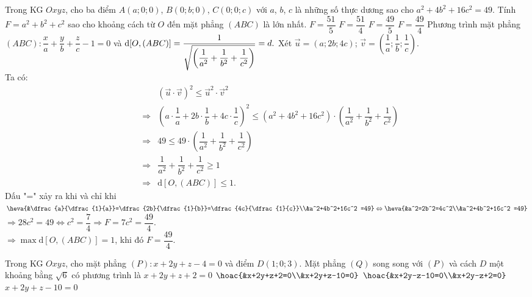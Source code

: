\begin{ex}%
	Trong KG $Oxyz$, cho ba điểm $A(a;0;0)$, $B(0;b;0)$, $C(0;0;c)$ với $a$, $b$, $c$ là những số thực dương sao cho $a^2+4b^2+16c^2=49$. Tính $F=a^2+b^2+c^2$ sao cho khoảng cách từ $O$ đến mặt phẳng $(ABC)$ là lớn nhất.
	\choice
	{$F=\dfrac{51}{5}$}
	{$F=\dfrac{51}{4}$}
	{$F=\dfrac{49}{5}$}
	{\True $F=\dfrac{49}{4}$}
	\loigiai
	{
		Phương trình mặt phẳng $(ABC): \dfrac{x}{a}+\dfrac{y}{b}+\dfrac{z}{c}-1=0$ và $\mathrm{d}[O,(ABC)]=\dfrac{1}{\sqrt{\left(\dfrac{1}{a^2}+\dfrac{1}{b^2}+\dfrac{1}{c^2}\right)}}=d.\\$	 
		Xét $\overrightarrow{u}=(a;2b;4c)$; $\overrightarrow{v}=\left(\dfrac{1}{a};\dfrac{1}{b};\dfrac{1}{c}\right)$.\\
		Ta có:
		\begin{eqnarray*}
			& & \left(\overrightarrow{u} \cdot \overrightarrow{v}\right)^2 \le \overrightarrow{u}^2 \cdot \overrightarrow{v}^2\\
			& \Rightarrow & \left(a \cdot \dfrac{1}{a} + 2b \cdot \dfrac{1}{b} +4c \cdot \dfrac{1}{c} \right)^2 \le \left(a^2+4b^2+16c^2\right) \cdot \left(\dfrac{1}{a^2}+\dfrac{1}{b^2}+\dfrac{1}{c^2}\right)\\
			& \Rightarrow & 49 \le 49 \cdot \left(\dfrac{1}{a^2}+\dfrac{1}{b^2}+\dfrac{1}{c^2}\right)\\
			& \Rightarrow &  \dfrac{1}{a^2}+\dfrac{1}{b^2}+\dfrac{1}{c^2} \ge 1 \\
			& \Rightarrow & \mathrm{d}[O,(ABC)] \le 1.
		\end{eqnarray*}
		Dấu "=" xảy ra khi và chỉ khi $\heva{&\dfrac{a}{\dfrac{1}{a}}=\dfrac{2b}{\dfrac{1}{b}}=\dfrac{4c}{\dfrac{1}{c}}\\&a^2+4b^2+16c^2 =49} \Leftrightarrow \heva{&a^2=2b^2=4c^2\\&a^2+4b^2+16c^2 =49}$\\
		$\Rightarrow 28c^2=49 \Leftrightarrow c^2 = \dfrac{7}{4} \Rightarrow F= 7c^2 = \dfrac{49}{4}$.\\
		$\Rightarrow \max\limits \mathrm{d}[O,(ABC)] =1$, khi đó $F=\dfrac{49}{4}$.
	}
\end{ex}
\begin{ex}%
	Trong KG $Oxyz$, cho mặt phẳng $ (P)\colon x+2y+z-4=0 $ và điểm $ D(1;0;3) $. Mặt phẳng $ (Q) $ song song với $ (P) $ và cách $ D $ một khoảng bằng $ \sqrt{6} $ có phương trình là
	\choice
	{$ x+2y+z+2=0 $}
	{\True $ \hoac{&x+2y+z+2=0\\&x+2y+z-10=0} $}
	{$ \hoac{&x+2y-z-10=0\\&x+2y-z+2=0} $}
	{$ x+2y+z-10=0 $}
\end{ex}

